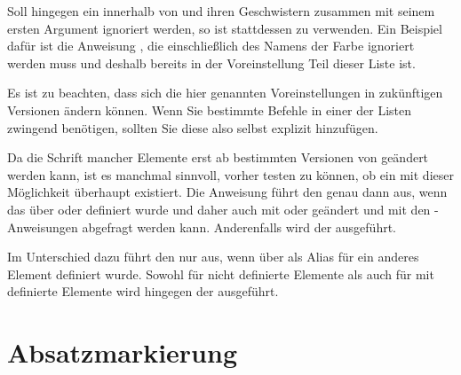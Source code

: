 Soll hingegen ein  innerhalb von
 und ihren Geschwistern zusammen mit
seinem ersten Argument ignoriert werden, so ist stattdessen
 zu verwenden. Ein Beispiel dafür ist die
Anweisung , die einschließlich des Namens der Farbe ignoriert
werden muss und deshalb bereits in der Voreinstellung Teil dieser Liste ist.

Es ist zu beachten, dass sich die hier genannten Voreinstellungen in
zukünftigen Versionen ändern können. Wenn Sie bestimmte Befehle in einer der
Listen zwingend benötigen, sollten Sie diese also selbst explizit hinzufügen.%
\EndIndexGroup


\begin{Declaration}
\end{Declaration}
Da die Schrift mancher Elemente erst ab
bestimmten Versionen von \KOMAScript{} geändert werden kann, ist es manchmal
sinnvoll, vorher testen zu können, ob ein  mit dieser
Möglichkeit überhaupt existiert. Die Anweisung  führt
den  genau dann aus, wenn das  über
 oder
 definiert wurde und daher auch mit
 oder 
geändert und mit den -Anweisungen abgefragt werden
kann. Anderenfalls wird der  ausgeführt.

Im Unterschied dazu führt
 den
 nur aus, wenn  über
 als Alias für ein anderes Element
definiert wurde. Sowohl für nicht definierte Elemente als auch für mit
 definierte Elemente wird hingegen der
 ausgeführt.%
\EndIndexGroup


\section{Absatzmarkierung}

